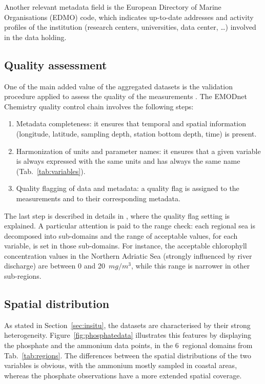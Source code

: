 \documentclass[essd, manuscript]{copernicus}
\begin{document}
Another relevant metadata field is the European Directory of Marine Organisations (EDMO) code, which indicates up-to-date addresses and activity profiles of the institution (research centers, universities, data center, \ldots) involved in the data holding.

\subsection{Quality assessment\label{sec:dataqualitycontrol}}

One of the main added value of the aggregated datasets is the validation procedure applied to assess the quality of the measurements \citep{Barth2015,Lipizer2021,Lipizer2023}. The EMODnet Chemistry quality control chain involves the following steps:
\begin{enumerate}
\item Metadata completeness: it ensures that temporal and spatial information (longitude, latitude, sampling depth, station bottom depth, time) is present.
\item Harmonization of units and parameter names: it ensures that a given variable is always expressed with the same units and has always the same name (Tab.~\ref{tab:variables}). 
\item Quality flagging of data and metadata: a quality flag is assigned to the measurements and to their corresponding metadata.
\end{enumerate} 
The last step is described in details in \citet{Lipizer2023}, where the quality flag setting is explained. A particular attention is paid to the range check: each regional sea is decomposed into sub-domains and the range of acceptable values, for each variable, is set in those sub-domains. For instance, the acceptable chlorophyll concentration values in the Northern Adriatic Sea (strongly influenced by river discharge) are between 0 and 20~$mg/m{^3}$, while this range is narrower in other sub-regions.

\subsection{Spatial distribution}

As stated in Section~\ref{sec:insitu}, the datasets are characterised by their strong heterogeneity. Figure~\ref{fig:phosphatedata} illustrates this features by displaying the phosphate and the ammonium data points, in the 6~regional domains from Tab.~\ref{tab:regions}. The differences between the spatial distributions of the two variables is obvious, with the ammonium mostly sampled in coastal areas, whereas the phosphate observations have a more extended spatial coverage.
\end{document}
